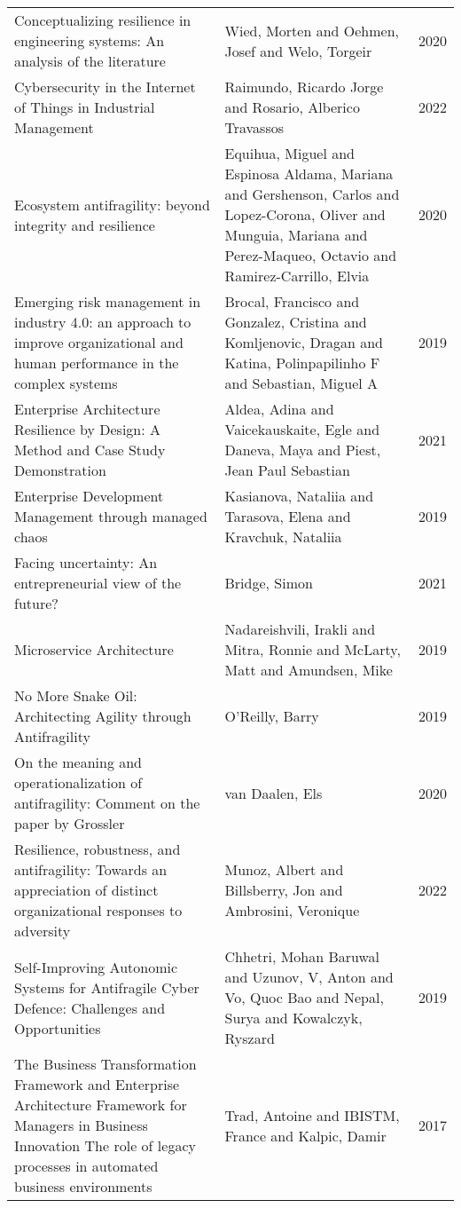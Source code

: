 \begin{longtable}{p{}p{}p{}}
		Conceptualizing resilience in engineering systems: An analysis of the literature & Wied, Morten and Oehmen, Josef and Welo, Torgeir & 2020 \\
		Cybersecurity in the Internet of Things in Industrial Management & Raimundo, Ricardo Jorge and Rosario, Alberico Travassos & 2022 \\
		Ecosystem antifragility: beyond integrity and resilience & Equihua, Miguel and Espinosa Aldama, Mariana and Gershenson, Carlos and Lopez-Corona, Oliver and Munguia, Mariana and Perez-Maqueo, Octavio and Ramirez-Carrillo, Elvia & 2020 \\
		Emerging risk management in industry 4.0: an approach to improve organizational and human performance in the complex systems & Brocal, Francisco and Gonzalez, Cristina and Komljenovic, Dragan and Katina, Polinpapilinho F and Sebastian, Miguel A & 2019 \\
		Enterprise Architecture Resilience by Design: A Method and Case Study Demonstration & Aldea, Adina and Vaicekauskaite, Egle and Daneva, Maya and Piest, Jean Paul Sebastian & 2021 \\
		Enterprise Development Management through managed chaos & Kasianova, Nataliia and Tarasova, Elena and Kravchuk, Nataliia & 2019 \\
		Facing uncertainty: An entrepreneurial view of the future? & Bridge, Simon & 2021 \\
		Microservice Architecture & Nadareishvili, Irakli and Mitra, Ronnie and McLarty, Matt and Amundsen, Mike & 2019 \\
		No More Snake Oil: Architecting Agility through Antifragility & O'Reilly, Barry & 2019 \\
		On the meaning and operationalization of antifragility: Comment on the paper by Grossler & van Daalen, Els & 2020 \\
		Resilience, robustness, and antifragility: Towards an appreciation of distinct organizational responses to adversity & Munoz, Albert and Billsberry, Jon and Ambrosini, Veronique & 2022 \\
		Self-Improving Autonomic Systems for Antifragile Cyber Defence: Challenges and Opportunities & Chhetri, Mohan Baruwal and Uzunov, V, Anton and Vo, Quoc Bao and Nepal, Surya and Kowalczyk, Ryszard & 2019 \\
		The Business Transformation Framework and Enterprise Architecture Framework for Managers in Business Innovation The role of legacy processes in automated business environments & Trad, Antoine and IBISTM, France and Kalpic, Damir & 2017 \\

\end{longtable}
